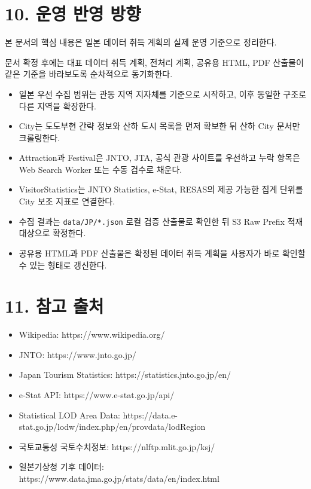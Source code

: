 \documentclass[12pt,a4paper]{article}
\newcommand{\DocNeedspace}[1]{\par\ifdim\dimexpr\pagegoal-\pagetotal\relax<#1\newpage\fi}
\newcommand{\TocNoChildTight}{\vspace{-0.28em}}
\begin{document}
\newpage

\DocNeedspace{10\baselineskip}
\section*{10. 운영 반영 방향}
\addtocontents{toc}{\protect\TocNoChildTight}


\DocNeedspace{3\baselineskip}
본 문서의 핵심 내용은 일본 데이터 취득 계획의 실제 운영 기준으로 정리한다.

\DocNeedspace{3\baselineskip}
문서 확정 후에는 대표 데이터 취득 계획, 전처리 계획, 공유용 HTML, PDF 산출물이 같은 기준을 바라보도록 순차적으로 동기화한다.


\begin{itemize}
\item 일본 우선 수집 범위는 관동 지역 지자체를 기준으로 시작하고, 이후 동일한 구조로 다른 지역을 확장한다.
\item City는 도도부현 간략 정보와 산하 도시 목록을 먼저 확보한 뒤 산하 City 문서만 크롤링한다.
\item Attraction과 Festival은 JNTO, JTA, 공식 관광 사이트를 우선하고 누락 항목은 Web Search Worker 또는 수동 검수로 채운다.
\item VisitorStatistics는 JNTO Statistics, e-Stat, RESAS의 제공 가능한 집계 단위를 City 보조 지표로 연결한다.
\item 수집 결과는 \texttt{data/\allowbreak{}JP/\allowbreak{}*.\allowbreak{}json} 로컬 검증 산출물로 확인한 뒤 S3 Raw Prefix 적재 대상으로 확정한다.
\item 공유용 HTML과 PDF 산출물은 확정된 데이터 취득 계획을 사용자가 바로 확인할 수 있는 형태로 갱신한다.
\end{itemize}


\newpage

\DocNeedspace{10\baselineskip}
\section*{11. 참고 출처}
\addtocontents{toc}{\protect\TocNoChildTight}


\begin{itemize}
\item Wikipedia: https://www.wikipedia.org/
\item JNTO: https://www.jnto.go.jp/
\item Japan Tourism Statistics: https://statistics.jnto.go.jp/en/
\item e-Stat API: https://www.e-stat.go.jp/api/
\item Statistical LOD Area Data: https://data.e-stat.go.jp/lodw/index.php/en/provdata/lodRegion
\item 국토교통성 국토수치정보: https://nlftp.mlit.go.jp/ksj/
\item 일본기상청 기후 데이터: https://www.data.jma.go.jp/stats/data/en/index.html
\end{itemize}
\end{document}
